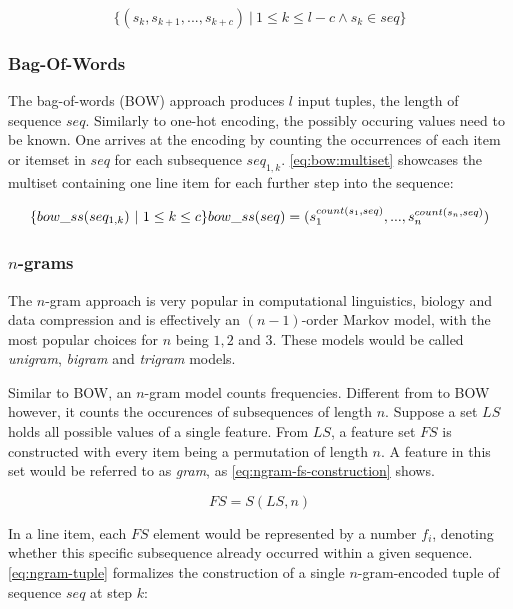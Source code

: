 \begin{equation}
    \label{eq:sliding-window:tuple-set}
    \{ (s_k, s_{k+1}, ..., s_{k+c})\ |\ 1 \leq k \leq l-c \wedge s_k \in seq \}
\end{equation}

\subsubsection*{Bag-Of-Words}
The bag-of-words (BOW) approach produces $l$ input tuples, the length of sequence $seq$. Similarly to one-hot encoding, the possibly occuring values need to be known. One arrives at the encoding by counting the occurrences of each item or itemset in $seq$ for each subsequence $seq_{1,k}$. \autoref{eq:bow:multiset} showcases the multiset containing one line item for each further step into the sequence:

\begin{equation}
    \label{eq:bow:multiset}
    \{ bow\_ss(seq_{1,k})\ |\ 1 \leq k \leq c \} \\
    bow\_ss(seq) = ( s_1^{count(s_1,seq)}, ..., s_n^{count(s_n,seq)} )
\end{equation}

\subsubsection*{$n$-grams}
The $n$-gram approach is very popular in computational linguistics, biology and data compression and is effectively an $(n-1)$-order Markov model, with the most popular choices for $n$ being $1,2$ and $3$. These models would be called \textit{unigram}, \textit{bigram} and \textit{trigram} models.

Similar to BOW, an $n$-gram model counts frequencies. Different from to BOW however, it counts the occurences of subsequences of length $n$. Suppose a set $LS$ holds all possible values of a single feature. From $LS$, a feature set $FS$ is constructed with every item being a permutation of length $n$. A feature in this set would be referred to as \textit{gram}, as \autoref{eq:ngram-fs-construction} shows.

\begin{equation}\label{eq:ngram-fs-construction}
    FS = S(LS, n)
\end{equation}

In a line item, each $FS$ element would be represented by a number $f_i$, denoting whether this specific subsequence already occurred within a given sequence. \autoref{eq:ngram-tuple} formalizes the construction of a single $n$-gram-encoded tuple of sequence $seq$ at step $k$:

